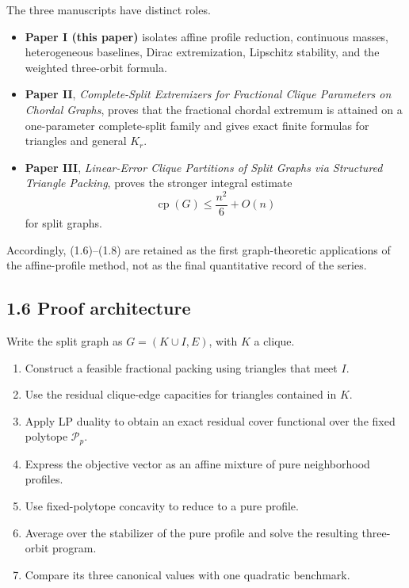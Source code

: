 \documentclass[11pt,a4paper]{article}
\providecommand{\tightlist}{\setlength{\itemsep}{0pt}\setlength{\parskip}{0pt}}
\begin{document}
The three manuscripts have distinct roles.

\begin{itemize}
\tightlist
\item
  \textbf{Paper I (this paper)} isolates affine profile reduction, continuous masses, heterogeneous baselines, Dirac extremization, Lipschitz stability, and the weighted three-orbit formula.
\item
  \textbf{Paper II}, \emph{Complete-Split Extremizers for Fractional Clique Parameters on Chordal Graphs}, proves that the fractional chordal extremum is attained on a one-parameter complete-split family and gives exact finite formulas for triangles and general \(K_r\).
\item
  \textbf{Paper III}, \emph{Linear-Error Clique Partitions of Split Graphs via Structured Triangle Packing}, proves the stronger integral estimate
  \[
  \operatorname{cp}(G)\le\frac{n^2}{6}+O(n)
  \]
  for split graphs.
\end{itemize}

Accordingly, (1.6)--(1.8) are retained as the first graph-theoretic applications of the affine-profile method, not as the final quantitative record of the series.

\subsection{1.6 Proof architecture}\label{proof-architecture}

Write the split graph as \(G=(K\cup I,E)\), with \(K\) a clique.

\begin{enumerate}
\def\labelenumi{\arabic{enumi}.}
\tightlist
\item
  Construct a feasible fractional packing using triangles that meet \(I\).
\item
  Use the residual clique-edge capacities for triangles contained in \(K\).
\item
  Apply LP duality to obtain an exact residual cover functional over the fixed polytope \(\mathcal P_p\).
\item
  Express the objective vector as an affine mixture of pure neighborhood profiles.
\item
  Use fixed-polytope concavity to reduce to a pure profile.
\item
  Average over the stabilizer of the pure profile and solve the resulting three-orbit program.
\item
  Compare its three canonical values with one quadratic benchmark.
\end{enumerate}
\end{document}

